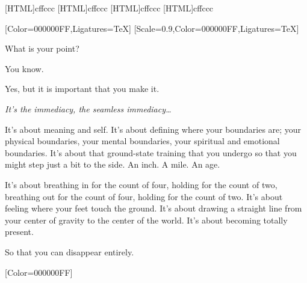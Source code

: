 [HTML]{cffccc}
[HTML]{cffccc}
[HTML]{cffccc}
[HTML]{cffccc}
\begin{paracol}{2}
  \begin{leftcolumn}
[Color=000000FF,Ligatures=TeX]
\renewfontfamily{}[Scale=0.9,Color=000000FF,Ligatures=TeX]

\begin{ally}
What is your point?
\end{ally}
You know.

\begin{ally}
Yes, but it is important that you make it.
\end{ally}
\emph{It's the immediacy, the seamless immediacy\ldots{}}

It's about meaning and self. It's about defining where your boundaries are; your physical boundaries, your mental boundaries, your spiritual and emotional boundaries. It's about that ground-state training that you undergo so that you might step just a bit to the side. An inch. A mile. An age.

It's about breathing in for the count of four, holding for the count of two, breathing out for the count of four, holding for the count of two. It's about feeling where your feet touch the ground. It's about drawing a straight line from your center of gravity to the center of the world. It's about becoming totally present.

\begin{ally}
So that you can disappear entirely.
\end{ally}
\newpage
\null
\thispagestyle{empty}
\newpage
\end{leftcolumn}
\end{paracol}


\renewfontfamily{}[Color=000000FF]

